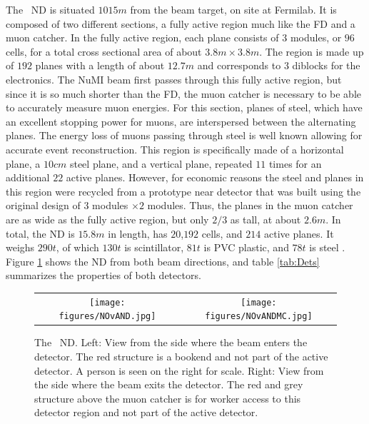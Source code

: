 The \nova~ND is situated $1015\unit{m}$ from the beam target, on site at Fermilab. It is composed of two different sections, a fully active region much like the FD and a muon catcher. In the fully active region, each plane consists of $3$ modules, or $96$ cells, for a total cross sectional area of about $3.8\unit{m} \times 3.8\unit{m}$. The region is made up of $192$ planes with a length of about $12.7\unit{m}$ and corresponds to $3$ diblocks for the electronics. The NuMI beam first passes through this fully active region, but since it is so much shorter than the FD, the muon catcher is necessary to be able to accurately measure muon energies. For this section, planes of steel, which have an excellent stopping power for muons, are interspersed between the alternating planes. The energy loss of muons passing through steel is well known allowing for accurate event reconstruction. This region is specifically made of a horizontal plane, a $10\unit{cm}$ steel plane, and a vertical plane, repeated $11$ times for an additional $22$ active planes. However, for economic reasons the steel and planes in this region were recycled from a prototype near detector that was built using the original design of $3$ modules $\times 2$ modules. Thus, the planes in the muon catcher are as wide as the fully active region, but only $2/3$ as tall, at about $2.6\unit{m}$. In total, the ND is $15.8\unit{m}$ in length, has $20$,$192$ cells, and $214$ active planes. It weighs $290\unit{t}$, of which $130\unit{t}$ is scintillator, $81\unit{t}$ is PVC plastic, and $78\unit{t}$ is steel \cite{ref:NDMass}. Figure \ref{fig:ND} shows the ND from both beam directions, and table \ref{tab:Dets} summarizes the properties of both detectors.
\begin{figure}[htb]
  \centering
  \begin{tabular}{c c}
    \texttt{[image: figures/NOvAND.jpg]} &
    \texttt{[image: figures/NOvANDMC.jpg]} \\
  \end{tabular}
  \caption[The \nova~Near Detector]{The \nova~ND. Left: View from the side where the beam enters the detector. The red structure is a bookend and not part of the active detector. A person is seen on the right for scale. Right: View from the side where the beam exits the detector. The red and grey structure above the muon catcher is for worker access to this detector region and not part of the active detector.}
  \label{fig:ND}
\end{figure}

